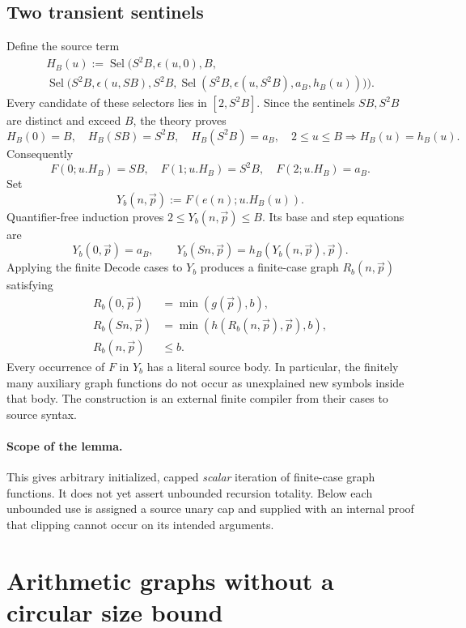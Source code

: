 \subsection{Two transient sentinels}
Define the source term
\[
\begin{split}
 H_B(u):=\operatorname{Sel}\bigl(S^2B,\epsilon(u,0),B,\quad\qquad\qquad\qquad\qquad\qquad\\
 \operatorname{Sel}\bigl(S^2B,\epsilon(u,SB),S^2B,
 \operatorname{Sel}(S^2B,\epsilon(u,S^2B),a_B,h_B(u))\bigr)\bigr).
\end{split}
\]
Every candidate of these selectors lies in $[2,S^2B]$. Since the
sentinels $SB,S^2B$ are distinct and exceed $B$, the theory proves
\[
 H_B(0)=B,\quad H_B(SB)=S^2B,\quad H_B(S^2B)=a_B,
 \quad 2\le u\le B\Longrightarrow H_B(u)=h_B(u).
\]
Consequently
\[
 F(0;u.H_B)=SB,\quad F(1;u.H_B)=S^2B,\quad F(2;u.H_B)=a_B.
\]
Set
\[
                      Y_b(n,\vec p):=F(e(n);u.H_B(u)).
\]
Quantifier-free induction proves $2\le Y_b(n,\vec p)\le B$.
Its base and step equations are
\[
 Y_b(0,\vec p)=a_B,\qquad
 Y_b(Sn,\vec p)=h_B(Y_b(n,\vec p),\vec p).
\]
Applying the finite Decode cases to $Y_b$ produces a finite-case
graph $R_b(n,\vec p)$ satisfying
\[
\begin{split}
 R_b(0,\vec p)&=\min(g(\vec p),b),\\
 R_b(Sn,\vec p)&=\min(h(R_b(n,\vec p),\vec p),b),\\
 R_b(n,\vec p)&\le b.
\end{split}
\tag{Bounded iteration}
\]
Every occurrence of $F$ in $Y_b$ has a literal source body. In
particular, the finitely many auxiliary graph functions do not occur
as unexplained new symbols inside that body. The construction is an
external finite compiler from their cases to source syntax.

\paragraph{Scope of the lemma.}
This gives arbitrary initialized, capped \emph{scalar} iteration of
finite-case graph functions. It does not yet assert unbounded
recursion totality. Below each unbounded use is assigned a source
unary cap and supplied with an internal proof that clipping cannot
occur on its intended arguments.

\section{Arithmetic graphs without a circular size bound}
\label{sec:selfseed-arithmetic}

